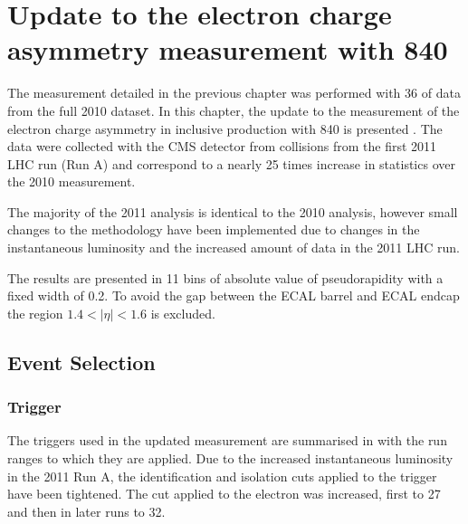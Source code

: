 \chapter[Update to the Electron Charge Asymmetry]{Update to the electron charge asymmetry
measurement with \unit{840}{\invpb} }
\label{chap:update}

The measurement detailed in the previous chapter was performed with
\unit{36}{\invpb} of data from the full 2010 dataset. 
In this chapter, the update to the measurement of the electron charge asymmetry in
inclusive \inclusiveWe production with \unit{840}{\invpb} is presented
\cite{asym840,bendavid2011electron}.
The data were collected with the {CMS} detector from collisions from the
first 2011 {LHC} run (Run A) and correspond to a nearly 25 times increase in
statistics over the 2010 measurement.

The majority of the 2011 analysis is identical to the 2010 analysis,
however small changes to the methodology have been implemented due to changes
in the instantaneous luminosity and the increased amount of data in the 2011 {LHC} run.

The results are presented in 11 bins of absolute value of pseudorapidity with a
fixed width of 0.2. To avoid the gap between the ECAL barrel and ECAL endcap the
region $1.4<|\eta|<1.6$ is excluded.

\section{Event Selection}

\subsection{Trigger}
\label{sec:trigger2}

The triggers used in the updated measurement are summarised in
 with the run ranges to which they are applied.
Due to the increased instantaneous luminosity in the 2011 Run A, the
identification and isolation cuts applied to the trigger have been tightened.
The \PT cut applied to the electron was increased, first to
\unit{27}{\GeV} and then in later runs to \unit{32}{\GeV}. 

